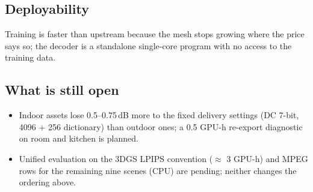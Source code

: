 \documentclass[11pt,a4paper]{article}
\begin{document}
\subsection{Deployability}

\begin{table}[h]
\centering\small
\caption{Deployability at the $\lambda = 6.2\times10^{-3}$ point. Laptop = MacBook Pro M2 Max (Chrome), phone = iPhone 17 Pro (Safari), WebGL2 viewer, SH degree 3, full capture resolution.}
\label{tab:deploy}
\end{table}

Training is faster than upstream because the mesh stops growing where the price says so; the decoder is a standalone single-core program with no access to the training data.

\subsection{What is still open}
\begin{itemize}[nosep,leftmargin=*]
  \item Indoor assets lose 0.5--0.75\,dB more to the fixed delivery settings (DC 7-bit, 4096 + 256 dictionary) than outdoor ones; a 0.5 GPU-h re-export diagnostic on room and kitchen is planned.
  \item Unified evaluation on the 3DGS LPIPS convention ($\approx$ 3 GPU-h) and MPEG rows for the remaining nine scenes (CPU) are pending; neither changes the ordering above.
\end{itemize}
\end{document}
